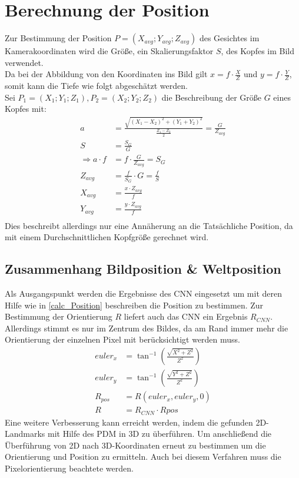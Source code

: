 \section{Berechnung der Position}
\label{calc_Position}
Zur Bestimmung der Position $P=(X_{avg};Y_{avg};Z_{avg})$ des Gesichtes im Kamerakoordinaten wird die Größe, ein Skalierungsfaktor $S$, des Kopfes im Bild verwendet.\\
Da bei der Abbildung von den Koordinaten ins Bild gilt $x=f\cdot \frac{X}{Z}$ und $ y=f\cdot \frac{Y}{Z}$, somit kann die Tiefe wie folgt abgeschätzt werden.\\
Sei $P_1 = (X_1;Y_1;Z_1), P_2=(X_2;Y_2;Z_2)$ die Beschreibung der Größe $G$ eines Kopfes mit:\\
\begin{align*}
a &= \frac{\sqrt{(X_1-X_2)^2+(Y_1+Y_2)^2}}{\frac{Z_1-Z_2}{2}} =\frac{G}{Z_{avg}}\\
S &= \frac{S_G}{G}\\
\Rightarrow a\cdot f &= f\cdot\frac{G}{Z_{avg}} = S_G\\
Z_{avg} &= \frac{f}{S_G}\cdot G = \frac{f}{S}\\
X_{avg} &= \frac{x \cdot Z_{avg}}{f}\\
Y_{avg} &= \frac{y \cdot Z_{avg}}{f}\\
\end{align*}
Dies beschreibt allerdings nur eine Annäherung an die Tatsächliche Position, da mit einem Durchschnittlichen Kopfgröße gerechnet wird.
\subsection{Zusammenhang Bildposition \& Weltposition}
Als Ausgangspunkt werden die Ergebnisse des CNN eingesetzt um mit deren Hilfe wie in \autoref{calc_Position} beschreiben die Position zu bestimmen. Zur Bestimmung der Orientierung $R$ liefert auch das CNN ein Ergebnis $R_{CNN}$. Allerdings stimmt es nur im Zentrum des Bildes, da am Rand immer mehr die Orientierung der einzelnen Pixel mit berücksichtigt werden muss.\\
\begin{align*}
euler_x &= \tan^{-1}(\frac{\sqrt{X^2+Z^2}}{Z^2})\\
euler_y &= \tan^{-1}(\frac{\sqrt{Y^2+Z^2}}{Z^2})\\
R_{pos} &= R(euler_x,euler_y,0)\\
R &= R_{CNN}\cdot R{pos}
\end{align*}
Eine weitere Verbesserung kann erreicht werden, indem die gefunden 2D-Landmarks mit Hilfe des PDM in 3D zu überführen. Um anschließend die Überführung von 2D nach 3D-Koordinaten erneut zu bestimmen um die Orientierung und Position zu ermitteln. Auch bei diesem Verfahren muss die Pixelorientierung beachtete werden.
